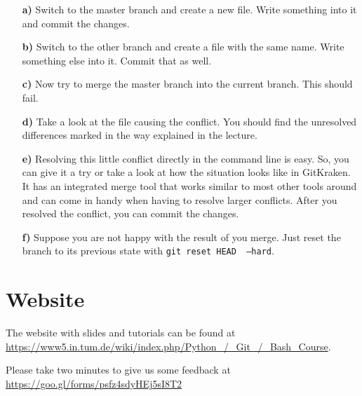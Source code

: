 \documentclass[11pt]{article}
\begin{document}
\begin{itemize}
\item[\bf{a)}] Switch to the master branch and create a new file. Write something into it and commit the changes.
\item[\bf{b)}]  Switch to the other branch and create a file with the same name. Write something else into it. Commit that as well.
\item[\bf{c)}] Now try to merge the master branch into the current branch. This should fail.
\item[\bf{d)}] Take a look at the file causing the conflict. You should find the unresolved differences marked in the way explained in the lecture.
\item[\bf{e)}] Resolving this little conflict directly in the command line is easy. So, you can give it a try or take a look at how the situation looks like in GitKraken. It has an integrated merge tool that works similar to most other tools around and can come in handy when having to resolve larger conflicts. After you resolved the conflict, you can commit the changes.
\item[\bf{f)}] Suppose you are not happy with the result of you merge. Just reset the branch to its previous state with \texttt{git reset HEAD~ --hard}.
\end{itemize}

\section*{Website}
\label{sec:Website}
The website with slides and tutorials can be found at\\
\url{https://www5.in.tum.de/wiki/index.php/Python_/_Git_/_Bash_Course}.

Please take two minutes to give us some feedback at \url{https://goo.gl/forms/psfz4sdyHEj5sI8T2}
\end{document}
